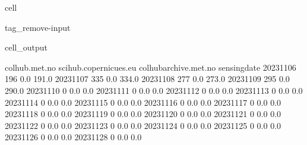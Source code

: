 \documentclass[letterpaper,10pt,english]{jupyterBook}
\begin{document}
\begin{sphinxuseclass}{cell}
\begin{sphinxuseclass}{tag_remove-input}\begin{sphinxVerbatimOutput}

\begin{sphinxuseclass}{cell_output}
\begin{sphinxVerbatim}[commandchars=\\\{\}]
              colhub.met.no  scihub.copernicues.eu  colhub\PYGZhy{}archive.met.no  \PYGZbs{}
sensing\PYGZus{}date                                                                
2023\PYGZhy{}11\PYGZhy{}06              196                    0.0                  191.0   
2023\PYGZhy{}11\PYGZhy{}07              335                    0.0                  334.0   
2023\PYGZhy{}11\PYGZhy{}08              277                    0.0                  273.0   
2023\PYGZhy{}11\PYGZhy{}09              295                    0.0                  290.0   
2023\PYGZhy{}11\PYGZhy{}10                0                    0.0                    0.0   
2023\PYGZhy{}11\PYGZhy{}11                0                    0.0                    0.0   
2023\PYGZhy{}11\PYGZhy{}12                0                    0.0                    0.0   
2023\PYGZhy{}11\PYGZhy{}13                0                    0.0                    0.0   
2023\PYGZhy{}11\PYGZhy{}14                0                    0.0                    0.0   
2023\PYGZhy{}11\PYGZhy{}15                0                    0.0                    0.0   
2023\PYGZhy{}11\PYGZhy{}16                0                    0.0                    0.0   
2023\PYGZhy{}11\PYGZhy{}17                0                    0.0                    0.0   
2023\PYGZhy{}11\PYGZhy{}18                0                    0.0                    0.0   
2023\PYGZhy{}11\PYGZhy{}19                0                    0.0                    0.0   
2023\PYGZhy{}11\PYGZhy{}20                0                    0.0                    0.0   
2023\PYGZhy{}11\PYGZhy{}21                0                    0.0                    0.0   
2023\PYGZhy{}11\PYGZhy{}22                0                    0.0                    0.0   
2023\PYGZhy{}11\PYGZhy{}23                0                    0.0                    0.0   
2023\PYGZhy{}11\PYGZhy{}24                0                    0.0                    0.0   
2023\PYGZhy{}11\PYGZhy{}25                0                    0.0                    0.0   
2023\PYGZhy{}11\PYGZhy{}26                0                    0.0                    0.0   
2023\PYGZhy{}11\PYGZhy{}28                0                    0.0                    0.0   

\end{sphinxVerbatim}
\end{sphinxuseclass}
\end{sphinxVerbatimOutput}
\end{sphinxuseclass}
\end{sphinxuseclass}
\end{document}

